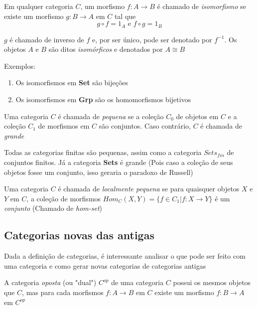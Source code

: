 \documentclass[../main.tex]{subfiles}
\begin{document}
\begin{definition}
    Em qualquer categoria $C$, um morfismo $f : A \to B$ é chamado de \emph{isomorfismo} se existe um morfismo $g : B \to A$ em $C$ tal que $$g \circ f = 1_A \text{ e } f \circ g = 1_B$$
\end{definition}

$g$ é chamado de inverso de $f$ e, por ser único, pode ser denotado por $f^{-1}$. Os objetos $A$ e $B$ são ditos \emph{isomórficos} e denotados por $A \cong B$

Exemplos:

\begin{enumerate}
    \item Os isomorfismos em \textbf{Set} são bijeções
    \item Os isomorfismos em \textbf{Grp} são os homomorfismos bijetivos
\end{enumerate}

\begin{definition}
    Uma categoria $C$ é chamada de \emph{pequena} se a coleção $C_0$ de objetos em $C$ e a coleção $C_1$ de morfismos em $C$ são conjuntos. Caso contrário, $C$ é chamada de \emph{grande}
\end{definition}

Todas as categorias finitas são pequenas, assim como a categoria \textbf{$Sets_{fin}$} de conjuntos finitos. Já a categoria \textbf{Sets} é grande (Pois caso a coleção de seus objetos fosse um conjunto, isso geraria o paradoxo de Russell)

\begin{definition}
    Uma categoria $C$ é chamada de \emph{localmente pequena} se para quaisquer objetos $X$ e $Y$ em $C$, a coleção de morfismos $Hom_C(X, Y) = \{f \in C_1 | f : X \to Y\}$ é um \emph{conjunto} (Chamado de \emph{hom-set})
\end{definition}

\subsection{Categorias novas das antigas}

Dada a definição de categorias, é interessante analisar o que pode ser feito com uma categoria e como gerar novas categorias de categorias antigas

\begin{definition}
    A categoria \emph{oposta} (ou "dual") $C^{op}$ de uma categoria $C$ possui os mesmos objetos que $C$, mas para cada morfismos $f : A \to B$ em $C$ existe um morfismo $f : B \to A$ em $C^{op}$
\end{definition}
\end{document}
